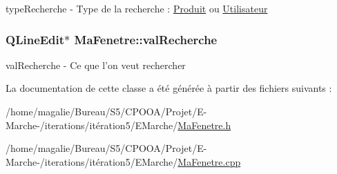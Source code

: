 type\-Recherche -\/ Type de la recherche \-: \hyperlink{class_produit}{Produit} ou \hyperlink{class_utilisateur}{Utilisateur} 

\hypertarget{class_ma_fenetre_a37836681a6d48a32dcd379b11447f579}{
\subsubsection[{val\-Recherche}]{\setlength{\rightskip}{0pt plus 5cm}Q\-Line\-Edit$\ast$ Ma\-Fenetre\-::val\-Recherche\hspace{0.3cm}{\ttfamily [protected]}}}\label{class_ma_fenetre_a37836681a6d48a32dcd379b11447f579}


val\-Recherche -\/ Ce que l'on veut rechercher 



La documentation de cette classe a été générée à partir des fichiers suivants \-:\begin{DoxyCompactItemize}
\item 
/home/magalie/\-Bureau/\-S5/\-C\-P\-O\-O\-A/\-Projet/\-E-\/\-Marche-\//iterations/itération5/\-E\-Marche/\hyperlink{_ma_fenetre_8h}{Ma\-Fenetre.\-h}\item 
/home/magalie/\-Bureau/\-S5/\-C\-P\-O\-O\-A/\-Projet/\-E-\/\-Marche-\//iterations/itération5/\-E\-Marche/\hyperlink{_ma_fenetre_8cpp}{Ma\-Fenetre.\-cpp}\end{DoxyCompactItemize}
